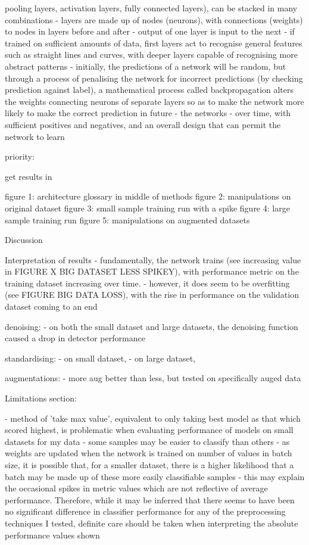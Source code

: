 \documentclass[11pt]{article}
\begin{document}
 pooling layers, activation layers, fully connected layers), can be stacked in many combinations
- layers are made up of nodes (neurons), with connections (weights) to nodes in layers before and after
- output of one layer is input to the next 
- if trained on sufficient amounts of data, first layers act to recognise general features such as straight lines and curves, with deeper layers capable of recognising more abstract patterns
- initially, the predictions of a network will be random, but through a process of penalising the network for incorrect predictions (by checking prediction against label), a mathematical process called backpropagation alters the weights connecting neurons of separate layers so as to make the network more likely to make the correct prediction in future  
- the networks 
- over time, with sufficient positives and negatives, and an overall design that can permit the network to learn 

priority:

get results in 

figure 1: architecture
glossary in middle of methods
figure 2: manipulations on original dataset
figure 3: small sample training run with a spike
figure 4: large sample training run 
figure 5: manipulations on augmented datasets 

Discussion

Interpretation of results
- fundamentally, the network trains (see increasing value in FIGURE X BIG DATASET LESS SPIKEY), with performance metric on the training dataset increasing over time. 
- however, it does seem to be overfitting (see FIGURE BIG DATA LOSS), with the rise in performance on the validation dataset coming to an end  

denoising:
- on both the small dataset and large datasets, the denoising function caused a drop in detector performance 

standardising:
- on small dataset,
- on large dataset,

augmentations:
- more aug better than less, but tested on specifically auged data

Limitations section:

- method of 'take max value', equivalent to only taking best model as that which scored highest, is problematic when evaluating performance of models on small datasets for my data
- some samples may be easier to classify than others 
- as weights are updated when the network is trained on number of values in batch size, it is possible that, for a smaller dataset, there is a higher likelihood that a batch may be made up of these more easily classifiable samples 
- this may explain the occasional spikes in metric values which are not reflective of average performance. Therefore, while it may be inferred that there seems to have been no significant difference in classifier performance for any of the preprocessing techniques I tested, definite care should be taken when interpreting the absolute performance values shown   
\end{document}
